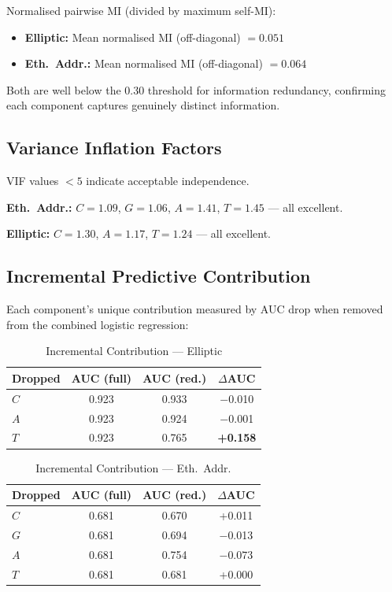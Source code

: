 \documentclass[journal]{IEEEtran}
\begin{document}
Normalised pairwise MI (divided by maximum self-MI):
\begin{itemize}
  \item \textbf{Elliptic:} Mean normalised MI (off-diagonal) $= 0.051$ \checkmark
  \item \textbf{Eth.\ Addr.:} Mean normalised MI (off-diagonal) $= 0.064$ \checkmark
\end{itemize}

Both are well below the 0.30 threshold for information redundancy, confirming each component captures genuinely distinct information.

\subsection{Variance Inflation Factors}

VIF values $<5$ indicate acceptable independence.

\textbf{Eth.\ Addr.:} $C = 1.09$, $G = 1.06$, $A = 1.41$, $T = 1.45$ --- all excellent.

\textbf{Elliptic:} $C = 1.30$, $A = 1.17$, $T = 1.24$ --- all excellent.

\subsection{Incremental Predictive Contribution}

Each component's unique contribution measured by AUC drop when removed from the combined logistic regression:

\begin{table}[!t]
\centering
\caption{Incremental Contribution --- Elliptic}
\label{tab:incr_elliptic}
\begin{tabular}{@{}lccc@{}}
\toprule
\textbf{Dropped} & \textbf{AUC (full)} & \textbf{AUC (red.)} & $\Delta$\textbf{AUC} \\
\midrule
$C$ & 0.923 & 0.933 & $-$0.010 \\
$A$ & 0.923 & 0.924 & $-$0.001 \\
$T$ & 0.923 & 0.765 & \textbf{+0.158} \\
\bottomrule
\end{tabular}
\end{table}

\begin{table}[!t]
\centering
\caption{Incremental Contribution --- Eth.\ Addr.}
\label{tab:incr_eth_addr}
\begin{tabular}{@{}lccc@{}}
\toprule
\textbf{Dropped} & \textbf{AUC (full)} & \textbf{AUC (red.)} & $\Delta$\textbf{AUC} \\
\midrule
$C$ & 0.681 & 0.670 & +0.011 \\
$G$ & 0.681 & 0.694 & $-$0.013 \\
$A$ & 0.681 & 0.754 & $\mathbf{-0.073}$ \\
$T$ & 0.681 & 0.681 & +0.000 \\
\bottomrule
\end{tabular}
\end{table}
\end{document}

